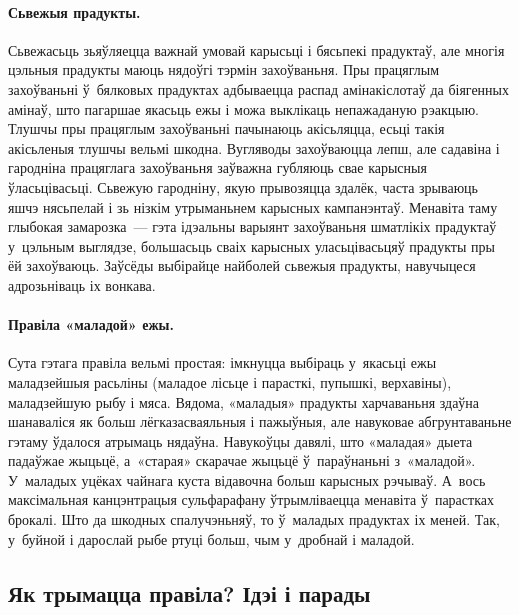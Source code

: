 \paragraph{Сьвежыя прадукты.}
Сьвежасьць зьяўляецца важнай умовай карысьці і бясьпекі прадуктаў, але многія цэльныя прадукты маюць нядоўгі тэрмін захоўваньня. Пры працяглым захоўваньні ў~бялковых прадуктах адбываецца распад амінакіслотаў да біягенных амінаў, што пагаршае якасьць ежы і можа выклікаць непажаданую рэакцыю. Тлушчы пры працяглым захоўваньні пачынаюць акісьляцца, есьці такія акісьленыя тлушчы вельмі шкодна. Вугляводы захоўваюцца лепш, але садавіна і гародніна працяглага захоўваньня заўважна губляюць свае карысныя ўласьцівасьці. Сьвежую гародніну, якую прывозяцца здалёк, часта зрываюць яшчэ нясьпелай і зь нізкім утрыманьнем карысных кампанэнтаў. Менавіта таму глыбокая замарозка~--- гэта ідэальны варыянт захоўваньня шматлікіх прадуктаў у~цэльным выглядзе, большасьць сваіх карысных уласьцівасьцяў прадукты пры ёй захоўваюць. Заўсёды выбірайце найболей сьвежыя прадукты, навучыцеся адрозьніваць іх вонкава.

\paragraph{Правіла «маладой» ежы.}
Сута гэтага правіла вельмі простая: імкнуцца выбіраць у~якасьці ежы маладзейшыя расьліны (маладое лісьце і парасткі, пупышкі, верхавіны), маладзейшую рыбу і мяса. Вядома, «маладыя» прадукты харчаваньня здаўна шанаваліся як больш лёгказасваяльныя і пажыўныя, але навуковае абгрунтаваньне гэтаму ўдалося атрымаць нядаўна. Навукоўцы давялі, што «маладая» дыета падаўжае жыцьцё, а~«старая» скарачае жыцьцё ў~параўнаньні з~«маладой». У~маладых уцёках чайнага куста відавочна больш карысных рэчываў. А~вось максімальная канцэнтрацыя сульфарафану ўтрымліваецца менавіта ў~парастках брокалі. Што да шкодных спалучэньняў, то ў~маладых прадуктах іх меней. Так, у~буйной і дарослай рыбе ртуці больш, чым у~дробнай і маладой.


\subsection{Як трымацца правіла? Ідэі і парады}

